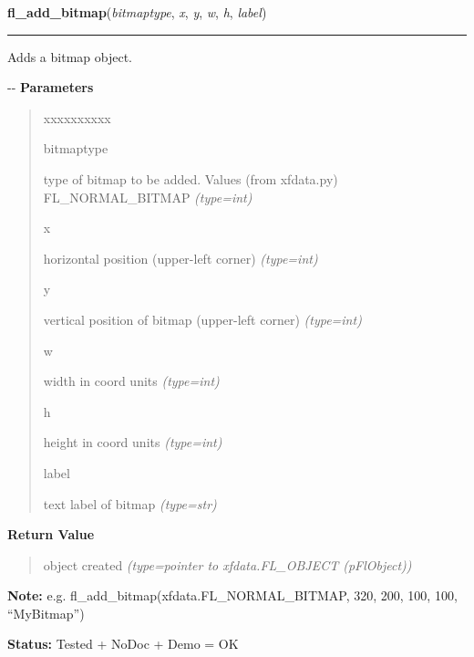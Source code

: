     \vspace{0.5ex}

\hspace{.8\funcindent}\begin{boxedminipage}{\funcwidth}

    \raggedright \textbf{fl\_add\_bitmap}(\textit{bitmaptype}, \textit{x}, \textit{y}, \textit{w}, \textit{h}, \textit{label})

    \vspace{-1.5ex}

    \rule{\textwidth}{0.5\fboxrule}
\setlength{\parskip}{2ex}

Adds a bitmap object.

-{}-
\setlength{\parskip}{1ex}
      \textbf{Parameters}
      \vspace{-1ex}

      \begin{quote}
        \begin{Ventry}{xxxxxxxxxx}

          \item[bitmaptype]


type of bitmap to be added. Values (from xfdata.py) FL\_NORMAL\_BITMAP
            {\it (type=int)}

          \item[x]


horizontal position (upper-left corner)
            {\it (type=int)}

          \item[y]


vertical position of bitmap (upper-left corner)
            {\it (type=int)}

          \item[w]


width in coord units
            {\it (type=int)}

          \item[h]


height in coord units
            {\it (type=int)}

          \item[label]


text label of bitmap
            {\it (type=str)}

        \end{Ventry}

      \end{quote}

      \textbf{Return Value}
    \vspace{-1ex}

      \begin{quote}

object created
      {\it (type=pointer to xfdata.FL\_OBJECT (pFlObject))}

      \end{quote}

\textbf{Note:} 
e.g. fl\_add\_bitmap(xfdata.FL\_NORMAL\_BITMAP, 320, 200, 100, 100,       ``MyBitmap'')


\textbf{Status:} 
Tested + NoDoc + Demo = OK


    \end{boxedminipage}

